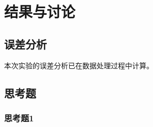 \documentclass[cn,hazy,pku,12pt,normal,math=newtx,cite=super]{elegantnote}
\begin{document}
\section{结果与讨论}

\subsection{误差分析}

本次实验的误差分析已在数据处理过程中计算。

\subsection{思考题}

\subsubsection{思考题1}
\end{document}
